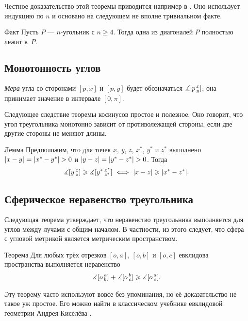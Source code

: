 {Честное доказательство этой теоремы приводится например в \cite{meisters}.
Оно использует индукцию по $n$ и основано на следующем не вполне тривиальном факте.

\begin{thm}{Факт}
Пусть $P$ --- $n$-угольник с $n\ge 4$.
Тогда одна из диагоналей $P$ полностью лежит в~$P$.
\end{thm}

\subsection*{Монотонность углов}

{}\emph{Мера} угла со сторонами $[p,x]$ и $[p,y]$ будет обозначаться $\measuredangle[p\,{}^{x}_{y}]$;
она принимает значение в интервале $[0,\pi]$.

Следующее следствие теоремы косинусов простое и полезное.
Оно говорит, что угол треугольника монотонно зависит от противолежащей стороны, если две другие стороны не меняют длины.

\begin{thm}{Лемма}\label{lem:angle-monotonicity}
Предположим, что для точек $x$, $y$, $z$, $x^{*}$, $y^{*}$ и $z^{*}$ выполнено $\dist{x}{y}{}\z=|x^{*}-y^{*}|>0$ и $|y-z|\z=|y^{*}-z^{*}|>0$.
Тогда 
\[\measuredangle[y\,{}^{x}_{z}]
\geqslant
\measuredangle[y^{*}\,{}^{x^{*}}_{z^{*}}]
\ \Longleftrightarrow\
|x-z|\geqslant |x^{*}-z^{*}|.\]
\end{thm}

\subsection*{Сферическое неравенство треугольника}

Следующая теорема утверждает, что неравенство треугольника выполняется для углов между лучами с общим началом.
В частности, из этого следует, что сфера с угловой метрикой является метрическим пространством.

\begin{thm}{Теорема}\label{thm:spherical-triangle-inq}
Для любых трёх отрезков $[o,a]$, $[o,b]$ и $[o,c]$ евклидова пространства выполняется неравенство
\[\measuredangle[o\,{}^{a}_{b}]
+
\measuredangle[o\,{}^{b}_{c}]
\geqslant
\measuredangle[o\,{}^{a}_{c}].\]

\end{thm}

Эту теорему часто используют вовсе без упоминания, но её доказательство не такое уж простое.
Его можно найти в классическом учебнике евклидовой геометрии Андрея Киселёва \cite[§ 47]{kiselyov}.

}

